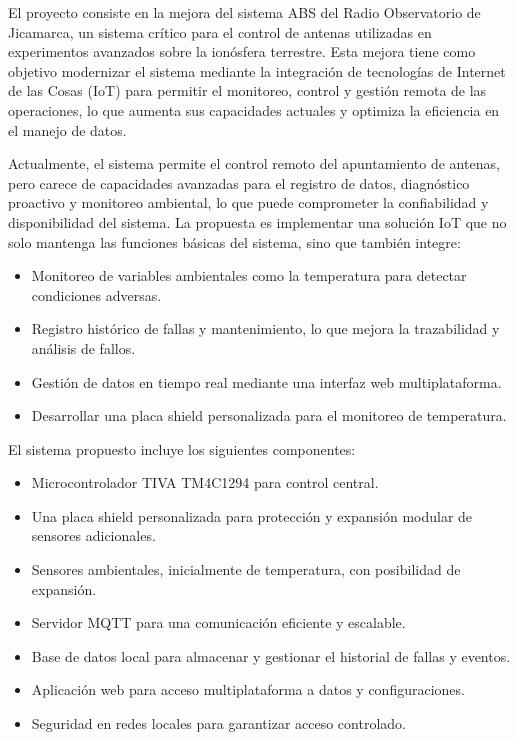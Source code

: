 \documentclass[
11pt, %
]{charter}
\begin{document}
El proyecto consiste en la mejora del sistema ABS del Radio Observatorio de Jicamarca, un sistema crítico para el control de antenas utilizadas en experimentos avanzados sobre la ionósfera terrestre. Esta mejora tiene como objetivo modernizar el sistema mediante la integración de tecnologías de Internet de las Cosas (IoT) para permitir el monitoreo, control y gestión remota de las operaciones, lo que aumenta sus capacidades actuales y optimiza la eficiencia en el manejo de datos.

Actualmente, el sistema permite el control remoto del apuntamiento de antenas, pero carece de capacidades avanzadas para el registro de datos, diagnóstico proactivo y monitoreo ambiental, lo que puede comprometer la confiabilidad y disponibilidad del sistema. La propuesta es implementar una solución IoT que no solo mantenga las funciones básicas del sistema, sino que también integre:

\begin{itemize}
	\item Monitoreo de variables ambientales como la temperatura para detectar condiciones adversas.
	\item Registro histórico de fallas y mantenimiento, lo que mejora la trazabilidad y análisis de fallos.
	\item Gestión de datos en tiempo real mediante una interfaz web multiplataforma.
	\item Desarrollar una placa shield personalizada para el monitoreo de temperatura.
\end{itemize}

El sistema propuesto incluye los siguientes componentes:
\begin{itemize}
    \item Microcontrolador TIVA TM4C1294 para control central.

	\item Una placa shield personalizada para protección y expansión modular de sensores adicionales.

	\item Sensores ambientales, inicialmente de temperatura, con posibilidad de expansión.

	\item Servidor MQTT para una comunicación eficiente y escalable.

	\item Base de datos local para almacenar y gestionar el historial de fallas y eventos.

	\item Aplicación web para acceso multiplataforma a datos y configuraciones.

	\item Seguridad en redes locales para garantizar acceso controlado.	
\end{itemize}
\end{document}
